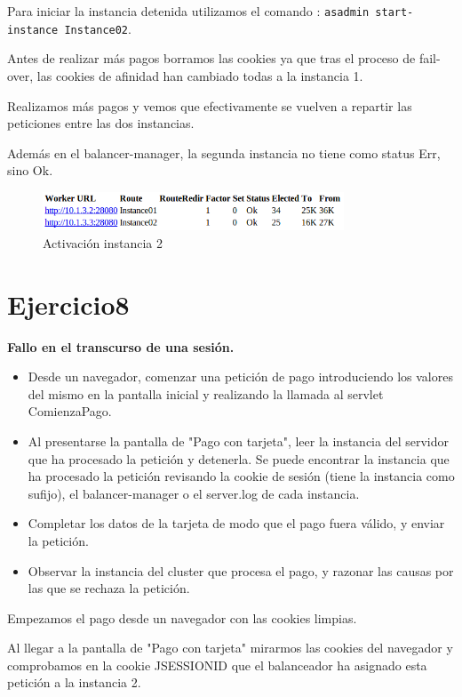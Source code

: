\documentclass[a4paper, 10pt]{article}
\begin{document}
Para iniciar la instancia detenida utilizamos el comando : \texttt{asadmin start-instance Instance02}.

Antes de realizar más pagos borramos las cookies ya que tras el proceso de fail-over, las cookies de afinidad han cambiado todas a la instancia 1.

Realizamos más pagos y vemos que efectivamente se vuelven a repartir las peticiones entre las dos instancias.


Además en el balancer-manager, la segunda instancia no tiene como status Err, sino Ok.


\begin{figure}[hbtp]
	\centering
	\includegraphics[width=0.8\textwidth]{../../P3/pantallazos/ej7.png}
	\caption { Activación instancia 2 }
\end{figure}
\newpage
\section{Ejercicio8}
\begin{mdframed}
	 \textbf{Fallo en el transcurso de una sesión.}
	 \begin{itemize}
	  \item Desde un navegador, comenzar una petición de pago introduciendo los valores del mismo en la
	  pantalla inicial y realizando la llamada al servlet ComienzaPago.
	  \item Al presentarse la pantalla de "Pago con tarjeta", leer la instancia del servidor que ha procesado la
	  petición y detenerla. Se puede encontrar la instancia que ha procesado la petición revisando la
	  cookie de sesión (tiene la instancia como sufijo), el balancer-manager o el server.log de cada
	  instancia.
	  \item Completar los datos de la tarjeta de modo que el pago fuera válido, y enviar la petición.
	  \item Observar la instancia del cluster que procesa el pago, y razonar las causas por las que se rechaza
	  la petición. 	
	 \end{itemize}
	
\end{mdframed}

Empezamos el pago desde un navegador con las cookies limpias.

Al llegar a la pantalla de "Pago con tarjeta" mirarmos las cookies del navegador y comprobamos en la cookie JSESSIONID que el balanceador ha asignado esta petición a la instancia 2.
\end{document}
